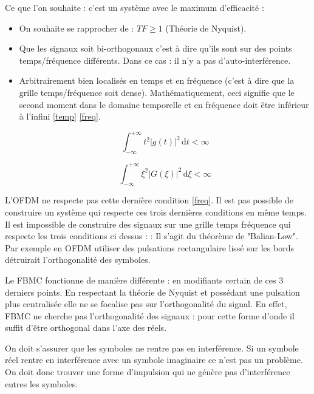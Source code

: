 \documentclass[conference]{IEEEtran}
\begin{document}
Ce que l'on souhaite : c’est un système avec le maximum d’efficacité : 
\begin{itemize}

	\item On souhaite se rapprocher de : $TF\ge1$ (Théorie de Nyquist).
	\item Que les signaux soit bi-orthogonaux c'est à dire qu'ils sont sur des points temps/fréquence différents. Dans ce cas : il n'y a pas d’auto-interférence. 
	\item Arbitrairement bien localisés en temps et en fréquence (c'est à dire que la grille temps/fréquence soit dense). Mathématiquement, ceci signifie que le second moment dans le domaine temporelle et en fréquence doit être inférieur à l’infini \eqref{temp} \eqref{freq}.

\begin{equation}
\int_{- \infty}^{+ \infty} t^{2} \lvert g(t) \rvert ^{2} \, \mathrm{d}t <\infty\label{temp}
\end{equation}

\begin{equation}
\int_{- \infty}^{+ \infty} \xi^{2} \lvert G(\xi) \rvert ^{2} \, \mathrm{d}\xi <\infty\label{freq}
\end{equation}
\end{itemize}
L’OFDM ne respecte pas cette dernière condition \eqref{freq}. 
Il est pas possible de construire un système qui respecte ces trois dernières conditions en même temps. Il est impossible de construire des signaux sur une grille temps fréquence qui respecte les trois conditions ci dessus : : Il s'agit du théorème de "Balian-Low".
Par exemple en OFDM utiliser des pulsations rectangulaire lissé sur les bords détruirait l'orthogonalité des symboles.


Le FBMC fonctionne de manière différente : en modifiants certain de ces 3 derniers points.
En respectant la théorie de Nyquist et possédant une pulsation plus centralisée elle ne se focalise pas sur l'orthogonalité du signal. En effet, FBMC ne cherche pas l’orthogonalité des signaux : pour cette forme d'onde il suffit d’être orthogonal dans l’axe des réels.

On doit s’assurer que les symboles ne rentre pas en interférence. Si un symbole réel rentre en interférence avec un symbole imaginaire ce n’est pas un problème.
On doit donc trouver une forme d'impulsion qui ne génère pas d’interférence entres les symboles.
\end{document}
